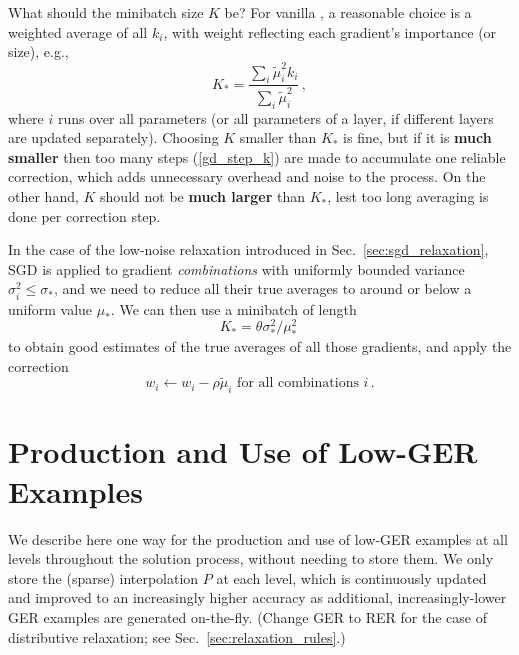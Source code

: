 \documentclass{article} %
\begin{document}
What should the minibatch size $K$ be? For vanilla \SGD, a reasonable choice is a weighted average of all $k_i$, with weight reflecting each gradient's importance (or size), e.g.,
\begin{equation}
  K_* = \frac{\sum_i \tilde{\mu}_i^2 k_i}{\sum_i \tilde{\mu}_i^2}\,,
\end{equation}
where $i$ runs over all parameters (or all parameters of a layer, if different layers are updated separately). Choosing $K$ smaller than $K_*$ is fine, but if it is \textbf{much smaller} then too many steps (\ref{gd_step_k}) are made to accumulate one reliable correction, which adds unnecessary overhead and noise to the process. On the other hand, $K$ should not be \textbf{much larger} than $K_*$, lest too long averaging is done per correction step.

In the case of the low-noise relaxation introduced in Sec.~\ref{sec:sgd_relaxation}, SGD is applied to gradient {\it combinations} with uniformly bounded variance $\sigma_i^2 \leq \sigma_*$, and we need to reduce all their true averages to around or below a uniform value $\mu_*$. We can then use a minibatch of length
\begin{equation}
    K_* = \theta \sigma_*^2 / \mu_*^2\
    \label{k_star}
\end{equation}
to obtain good estimates of the true averages of all those gradients, and apply the correction
\begin{equation}
    w_i \longleftarrow w_i - \rho \tilde{\mu}_i \text{ for all combinations } i\,.
    \label{correction_tilde}
\end{equation}


\section{Production and Use of Low-GER Examples}
\label{sec:low_ger}

We describe here one way for the production and use of low-GER examples at all levels throughout the solution process, without needing to store them. We only store the (sparse) interpolation $P$ at each level, which is continuously updated and improved to an increasingly higher accuracy as additional, increasingly-lower GER examples are generated on-the-fly. (Change GER to RER for the case of distributive relaxation; see Sec.~\ref{sec:relaxation_rules}.)
\end{document}
